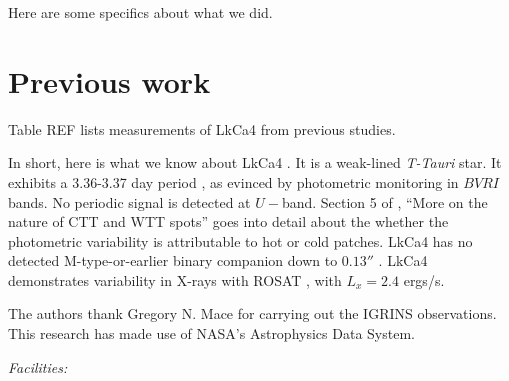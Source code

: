 \documentclass[onecolumn]{emulateapj}%
\newcommand{\name}{LkCa4 }
\begin{document}
Here are some specifics about what we did.

\section{Previous work}

Table REF lists measurements of LkCa4 from previous studies.


In short, here is what we know about \name.  It is a weak-lined \emph{T-Tauri} star.  It exhibits a 3.36-3.37 day period \citep{1993AJ....106.1608V,1994IBVS.4042....1G}, as evinced by photometric monitoring in $BVRI$ bands.  No periodic signal is detected at $U-$band.  Section 5 of \citet{1993AJ....106.1608V}, ``More on the nature of CTT and WTT spots'' goes into detail about the whether the photometric variability is attributable to hot or cold patches.  \name has no detected M-type-or-earlier binary companion down to $0.13''$ \citep{1993A&A...278..129L}.  \name demonstrates variability in X-rays with ROSAT \citep{1994ApJ...424..237S}, with $L_{x}=2.4$ ergs/s.


\acknowledgements
The authors thank Gregory N. Mace for carrying out the IGRINS observations. This research has made use of NASA's Astrophysics Data System.

{\it Facilities:} 

\clearpage



\end{document}
